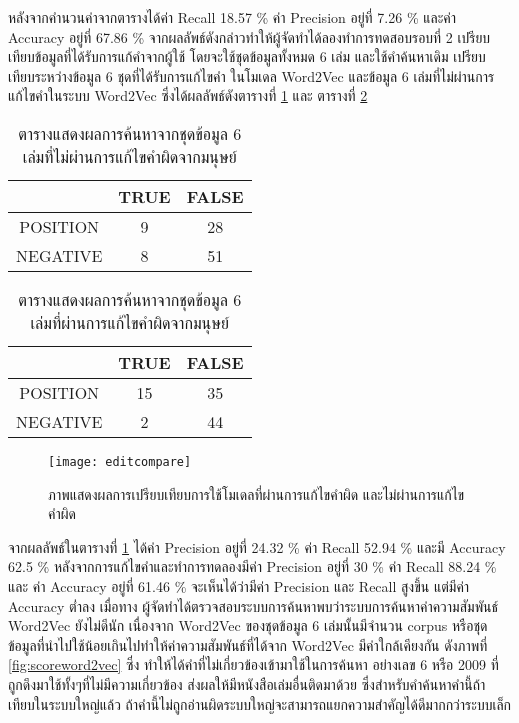     หลังจากคำนวนค่าจากตารางได้ค่า Recall 18.57 \% ค่า Precision อยู่ที่ 7.26 \% และค่า Accuracy อยู่ที่ 67.86 \%  
    จากผลลัพธ์ดังกล่าวทำให้ผู้จัดทำได้ลองทำการทดสอบรอบที่ 2 เปรียบเทียบข้อมูลที่ได้รับการแก้คำจากผู้ใช้ 
    โดยจะใช้ชุดข้อมูลทั้งหมด 6 เล่ม และใช้คำค้นหาเดิม เปรียบเทียบระหว่างข้อมูล 6 ชุดที่ได้รับการแก้ไขคำ
    ในโมเดล Word2Vec และข้อมูล 6 เล่มที่ไม่ผ่านการแก้ไขคำในระบบ Word2Vec ซึ่งได้ผลลัพธ์ดังตารางที่ 
    \ref{tbl:evasearch2} และ ตารางที่ \ref{tbl:evasearch3}

\begin{table}[H]
    \caption{ตารางแสดงผลการค้นหาจากชุดข้อมูล 6 เล่มที่ไม่ผ่านการแก้ไขคำผิดจากมนุษย์}\label{tbl:evasearch2}
    \begin{tabular}{|c|c|c|}
    \hline
                & TRUE & FALSE \\ \hline
    POSITION & 9   & 28   \\ \hline
    NEGATIVE & 8   & 51   \\ \hline
    \end{tabular}
    \end{table}

\begin{table}[H]
    \caption{ตารางแสดงผลการค้นหาจากชุดข้อมูล 6 เล่มที่ผ่านการแก้ไขคำผิดจากมนุษย์}\label{tbl:evasearch3}
    \begin{tabular}{|c|c|c|}
    \hline
                & TRUE & FALSE \\ \hline
    POSITION & 15   & 35   \\ \hline
    NEGATIVE & 2   & 44   \\ \hline
    \end{tabular}
    \end{table}

\begin{figure}[H]
    \centering
    \texttt{[image: editcompare]}
    \caption{ภาพแสดงผลการเปรียบเทียบการใช้โมเดลที่ผ่านการแก้ไขคำผิด และไม่ผ่านการแก้ไขคำผิด}\label{fig:editcompare}
\end{figure}
    
    จากผลลัพธ์ในตารางที่ \ref{tbl:evasearch2} ได้ค่า Precision อยู่ที่ 24.32 \% ค่า Recall 52.94 \% และมี 
    Accuracy 62.5 \% หลังจากการแก้ไขคำและทำการทดลองมีค่า Precision อยู่ที่ 30 \% ค่า Recall 88.24 \% และ
    ค่า Accuracy อยู่ที่ 61.46 \% จะเห็นได้ว่ามีค่า Precision และ Recall สูงขึ้น แต่มีค่า Accuracy ต่ำลง เมื่อทาง
    ผู้จัดทำได้ตรวจสอบระบบการค้นหาพบว่าระบบการค้นหาค่าความสัมพันธ์ Word2Vec ยังไม่ดีนัก เนื่องจาก 
    Word2Vec ของชุดข้อมูล 6 เล่มนั้นมีจำนวน corpus หรือชุดข้อมูลที่นำไปใช้น้อยเกินไปทำให้ค่าความสัมพันธ์ที่ได้จาก 
    Word2Vec มีค่าใกล้เคียงกัน ดังภาพที่ \ref{fig:scoreword2vec} ซึ่ง ทำให้ได้คำที่ไม่เกี่ยวข้องเข้ามาใช้ในการค้นหา อย่างเลข 6 
    หรือ 2009 ที่ถูกดึงมาใช้ทั้งๆที่ไม่มีความเกี่ยวข้อง ส่งผลให้มีหนังสือเล่มอื่นติดมาด้วย ซึ่งสำหรับคำค้นหาคำนี้ถ้า
    เทียบในระบบใหญ่แล้ว ถ้าคำนี้ไม่ถูกอ่านผิดระบบใหญ่จะสามารถแยกความสำคัญได้ดีมากกว่าระบบเล็ก
    
